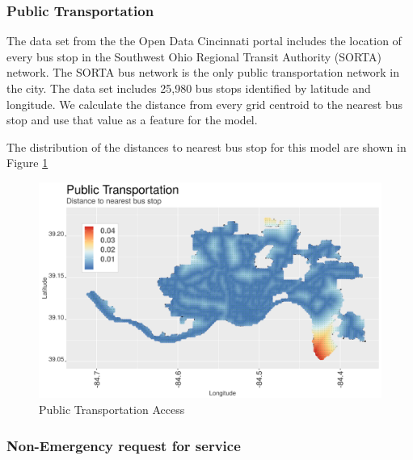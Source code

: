 \documentclass{llncs}
\begin{document}

\subsubsection{Public Transportation}

The data set from the the Open Data Cincinnati portal  includes the location of every bus stop in the  Southwest Ohio Regional Transit Authority (SORTA) network. The SORTA bus network is the only public transportation network in the city. The data set includes 25,980 bus stops identified by latitude and longitude. We calculate the distance from every grid centroid to the nearest bus stop and use that value as a feature for the model. 

The distribution of the distances to nearest bus stop for this model are shown in Figure \ref{figure : busStopDistances}

\FloatBarrier
\begin{figure}
 	\includegraphics[width=\textwidth, height=\textheight, keepaspectratio]{busStopDistances}
 	\caption{Public Transportation Access}
	\label{figure : busStopDistances}
\end{figure}
\FloatBarrier


\subsubsection{Non-Emergency request for service}
\end{document}
